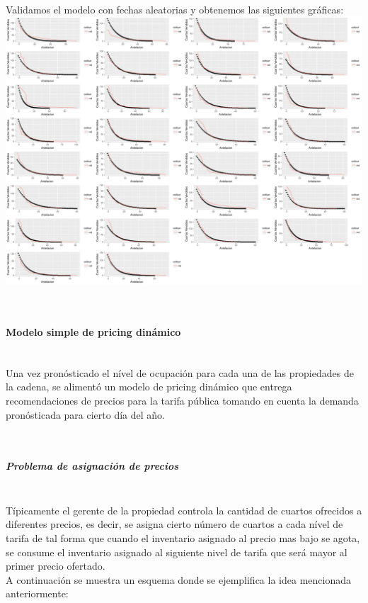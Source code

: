 \documentclass{article}\usepackage[]{graphicx}\usepackage[]{color}
\makeatletter
\def\maxwidth{ %
  \ifdim\Gin@nat@width>\linewidth
    \linewidth
  \else
    \Gin@nat@width
  \fi
}
\newenvironment{knitrout}{}{} %
\makeatother
\begin{document}
~\\
Validamos el modelo con fechas aleatorias y obtenemos las siguientes gráficas:
~\\
\begin{knitrout}
\color{fgcolor}
\includegraphics[width=\maxwidth]{figures/ValidacionModelo-1} 

\end{knitrout}
~\\
\paragraph{Modelo simple de pricing dinámico}~\\
Una vez pronósticado el nível de ocupación para cada una de las propiedades de la cadena, se alimentó un modelo de pricing dinámico que entrega recomendaciones de precios para la tarifa pública tomando en cuenta la demanda pronósticada para cierto día del año.

~\\
\subparagraph{Problema de asignación de precios}~\\
Típicamente el gerente de la propiedad controla la cantidad de cuartos ofrecidos a diferentes precios, es decir, se asigna cierto número de cuartos a cada nível de tarifa de tal forma que cuando el inventario asignado al precio mas bajo se agota, se consume el inventario asignado al siguiente nivel de tarifa que será mayor al primer precio ofertado. 
~\\
A continuación se muestra un esquema donde se ejemplifica la idea mencionada anteriormente:
\end{document}
